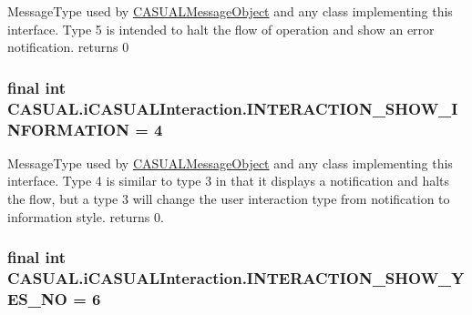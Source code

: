 Message\-Type used by \hyperlink{classCASUAL_1_1CASUALMessageObject}{C\-A\-S\-U\-A\-L\-Message\-Object} and any class implementing this interface. Type 5 is intended to halt the flow of operation and show an error notification. returns 0 \hypertarget{interfaceCASUAL_1_1iCASUALInteraction_a88a985d1905b2af7cfa06932e1019346}{
\subsubsection[{I\-N\-T\-E\-R\-A\-C\-T\-I\-O\-N\-\_\-\-S\-H\-O\-W\-\_\-\-I\-N\-F\-O\-R\-M\-A\-T\-I\-O\-N}]{\setlength{\rightskip}{0pt plus 5cm}final int C\-A\-S\-U\-A\-L.\-i\-C\-A\-S\-U\-A\-L\-Interaction.\-I\-N\-T\-E\-R\-A\-C\-T\-I\-O\-N\-\_\-\-S\-H\-O\-W\-\_\-\-I\-N\-F\-O\-R\-M\-A\-T\-I\-O\-N = 4}}\label{interfaceCASUAL_1_1iCASUALInteraction_a88a985d1905b2af7cfa06932e1019346}
Message\-Type used by \hyperlink{classCASUAL_1_1CASUALMessageObject}{C\-A\-S\-U\-A\-L\-Message\-Object} and any class implementing this interface. Type 4 is similar to type 3 in that it displays a notification and halts the flow, but a type 3 will change the user interaction type from notification to information style. returns 0. \hypertarget{interfaceCASUAL_1_1iCASUALInteraction_aa943e8a9c4f74899de6071e708fe7fdb}{
\subsubsection[{I\-N\-T\-E\-R\-A\-C\-T\-I\-O\-N\-\_\-\-S\-H\-O\-W\-\_\-\-Y\-E\-S\-\_\-\-N\-O}]{\setlength{\rightskip}{0pt plus 5cm}final int C\-A\-S\-U\-A\-L.\-i\-C\-A\-S\-U\-A\-L\-Interaction.\-I\-N\-T\-E\-R\-A\-C\-T\-I\-O\-N\-\_\-\-S\-H\-O\-W\-\_\-\-Y\-E\-S\-\_\-\-N\-O = 6}}\label{interfaceCASUAL_1_1iCASUALInteraction_aa943e8a9c4f74899de6071e708fe7fdb}
